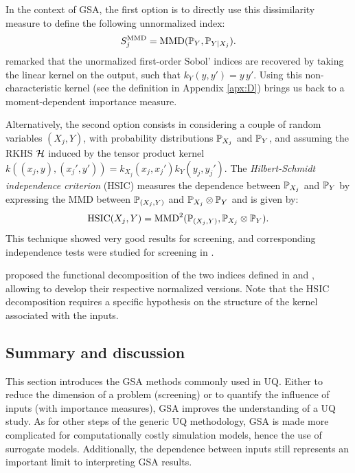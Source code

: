 In the context of GSA, the first option is to directly use this dissimilarity measure to define the following unnormalized index: 
\begin{equation}
    S_j^{\MMD} = \MMD(\P_Y, \P_{Y |X_j}). 
    \label{eq:mmd_gsa}
\end{equation}
\citet{daveiga_2021_kernel_ANOVA} remarked that the unormalized first-order Sobol' indices are recovered by taking the linear kernel on the output, such that $k_{Y}(y, y')=y\, y'$. 
Using this non-characteristic kernel (see the definition in Appendix \ref{apx:D}) brings us back to a moment-dependent importance measure. 

Alternatively, the second option consists in considering a couple of random variables $(X_j, Y)$, with probability distributions $\P_{X_j}$ and $\P_Y$, and assuming the RKHS $\iH$  
induced by the tensor product kernel $k((x_j, y), (x_j', y')) = k_{X_j}(x_j, x_j') k_{Y}(y_j, y_j')$. 
The \textit{Hilbert-Schmidt independence criterion} (HSIC) measures the dependence between $\P_{X_j}$ and $\P_Y$ by expressing the MMD between $\P_{(X_j, Y)}$ and $\P_{X_j} \otimes \P_{Y}$ and is given by: 
\begin{equation}
    \mathrm{HSIC}(X_j, Y) = \MMD^2(\P_{(X_j, Y)}, \P_{X_j} \otimes \P_{Y}).
    \label{eq:hsic}
\end{equation}
This technique showed very good results for screening, and corresponding independence tests were studied for screening in \citet{delozzo_2016_hsic_test}. 

\citet{daveiga_2021_kernel_ANOVA} proposed the functional decomposition of the two indices defined in  and , allowing to develop their respective normalized versions. 
Note that the HSIC decomposition requires a specific hypothesis on the structure of the kernel associated with the inputs. 



\subsection{Summary and discussion}

This section introduces the GSA methods commonly used in UQ. 
Either to reduce the dimension of a problem (screening) or to quantify the influence of inputs (with importance measures), GSA improves the understanding of a UQ study.   
As for other steps of the generic UQ methodology, GSA is made more complicated for computationally costly simulation models, hence the use of surrogate models. 
Additionally, the dependence between inputs still represents an important limit to interpreting GSA results. 

